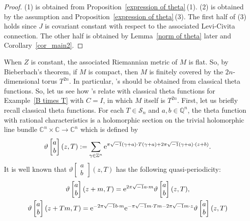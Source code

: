 \documentclass[10pt,a4paper]{amsart}
\numberwithin{equation}{section}
\newcommand{\C}{\mathbb{C}}
\newcommand{\Z}{\mathbb{Z}}
\newcommand{\Q}{\mathbb{Q}}
\begin{document}
\begin{proof}
(1) is obtained from Proposition~\ref{expression of theta}\,(1). (2) is obtained by the assumption and Proposition~\ref{expression of theta}\,(3). The first half of (3) holds since $J$ is covariant constant with respect to the associated Levi-Civita connection. The other half is obtained by Lemma~\ref{norm of theta} later and Corollary~\ref{cor_main2}.
\end{proof}

When $Z$ is constant, the associated Riemannian metric of $M$ is flat. So, by Bieberbach's theorem, if $M$ is compact, then $M$ is finitely covered by the $2n$-dimensional torus $T^{2n}$. In particular, 's should be obtained from classical theta functions. So, let us see how 's relate with classical theta functions for Example~\ref{B times T} with $C=I$, in which $M$ itself is $T^{2n}$. First, let us briefly recall classical theta functions. For each $T\in {\mathcal S}_n$ and $a, b\in \Q^n$, the theta function with rational characteristics is a holomorphic %
section on the trivial holomorphic line bundle $\C^n\times \C\to \C^n$ which is defined by
\[
\vartheta
\begin{bmatrix}
a \\
b
\end{bmatrix}
( z, T):=\sum_{\gamma \in \Z^n}{\rm e}^{\pi\sqrt{-1}(\gamma+a)\cdot T ( \gamma+a)+2\pi\sqrt{-1}( \gamma+a)\cdot ( z+b)} .
\]
It is well known that $\vartheta
\begin{bmatrix}
a \\
b
\end{bmatrix}
( z, T)$ has the following quasi-periodicity:
\begin{gather*}
\vartheta
\begin{bmatrix}
a \\
b
\end{bmatrix}
( z+m, T)={\rm e}^{2\pi\sqrt{-1}a\cdot m}
\vartheta
\begin{bmatrix}
a \\
b
\end{bmatrix}
( z, T) ,\\
\vartheta
\begin{bmatrix}
a \\
b
\end{bmatrix}
( z+Tm, T)={\rm e}^{-2\pi\sqrt{-1}b\cdot m}{\rm e}^{-\pi\sqrt{-1}m\cdot Tm-2\pi\sqrt{-1}m\cdot z}
\vartheta
\begin{bmatrix}
a \\
b
\end{bmatrix}
( z, T)
\end{gather*}
\end{document}
